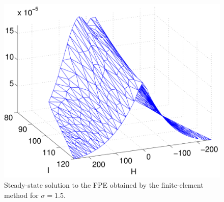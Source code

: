 \begin{figure}
\begin{center}
\includegraphics[width=\textwidth]{figures/fpe_solution_sigma_1p5}
\caption{Steady-state solution to the FPE obtained by the finite-element method for $\sigma = 1.5$.}
\label{f:fpe_sigma_1.5}
\end{center}
\end{figure}
